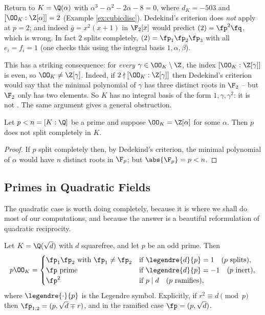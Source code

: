 \begin{example}\label{ex:nonmonogenic}
	Return to $K = \Q(\alpha)$ with $\alpha^3-\alpha^2-2\alpha-8 = 0$, where $d_K = -503$ and $[\OO_K:\Z[\alpha]] = 2$ (Example \ref{ex:cubicdisc}). Dedekind's criterion does \emph{not} apply at $p=2$; and indeed $\bar g = x^2(x+1)$ in $\F_2[x]$ would predict $(2) = \fp^2\fq$, which is wrong. In fact $2$ splits completely, $(2) = \fp_1\fp_2\fp_3$ with all $e_i = f_i = 1$ (one checks this using the integral basis $1, \alpha, \beta$).

	This has a striking consequence: for \emph{every} $\gamma \in \OO_K \setminus \Z$, the index $[\OO_K:\Z[\gamma]]$ is even, so $\OO_K \neq \Z[\gamma]$. Indeed, if $2 \nmid [\OO_K:\Z[\gamma]]$ then Dedekind's criterion would say that the minimal polynomial of $\gamma$ has three distinct roots in $\F_2$ -- but $\F_2$ only has two elements. So $K$ has no integral basis of the form $1,\gamma,\gamma^2$: it is not . The same argument gives a general obstruction.
\end{example}

\begin{corollary}
	Let $p < n = [K:\Q]$ be a prime and suppose $\OO_K = \Z[\alpha]$ for some $\alpha$. Then $p$ does not split completely in $K$.
\end{corollary}

\begin{proof}
	If $p$ split completely then, by Dedekind's criterion, the minimal polynomial of $\alpha$ would have $n$ distinct roots in $\F_p$; but $\abs{\F_p} = p < n$.
\end{proof}

\subsection{Primes in Quadratic Fields}

The quadratic case is worth doing completely, because it is where we shall do most of our computations, and because the answer is a beautiful reformulation of quadratic reciprocity.

\begin{proposition}\label{prop:quadsplit}
	Let $K = \Q(\sqrt d)$ with $d$ squarefree, and let $p$ be an odd prime. Then
	$$p\OO_K = \begin{cases}
		\fp_1\fp_2 \text{ with } \fp_1 \neq \fp_2 & \text{if } \legendre{d}{p} = 1 \quad (\text{$p$ splits}),\\
		\fp \text{ prime} & \text{if } \legendre{d}{p} = -1 \quad (\text{$p$ inert}),\\
		\fp^2 & \text{if } p \mid d \quad (\text{$p$ ramifies}),
	\end{cases}$$
	where $\legendre{\cdot}{p}$ is the Legendre symbol. Explicitly, if $r^2 \equiv d \pmod p$ then $\fp_{1,2} = (p, \sqrt d \mp r)$, and in the ramified case $\fp = (p,\sqrt d)$.
\end{proposition}

